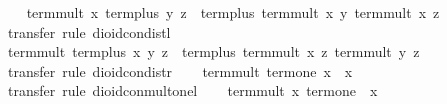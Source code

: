 \begin{isabellebody}
\ \ \isamarkupfalse%
\ {}term{}mult\ x\ {}term{}plus\ y\ z{}\ {}\ term{}plus\ {}term{}mult\ x\ y{}\ {}term{}mult\ x\ z{}{}\isanewline
\ \ \ \ \isamarkupfalse%
\ {}transfer{}\ rule\ dioid{}con{}distl{}\isanewline
\ \ \isamarkupfalse%
\ {}term{}mult\ {}term{}plus\ x\ y{}\ z\ {}\ term{}plus\ {}term{}mult\ x\ z{}\ {}term{}mult\ y\ z{}{}\isanewline
\ \ \ \ \isamarkupfalse%
\ {}transfer{}\ rule\ dioid{}con{}distr{}\isanewline
\ \ \isamarkupfalse%
\ {}term{}mult\ term{}one\ x\ {}\ x{}\isanewline
\ \ \ \ \isamarkupfalse%
\ {}transfer{}\ rule\ dioid{}con{}mult{}onel{}\isanewline
\ \ \isamarkupfalse%
\ {}term{}mult\ x\ term{}one\ {}\ x{}\isanewline

\end{isabellebody}
